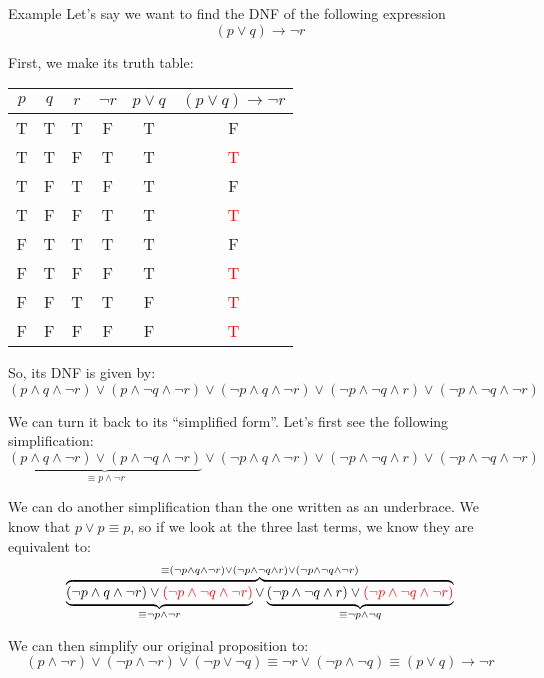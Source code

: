 \documentclass{article}
\begin{document}
\begin{parag}{Example}
    Let's say we want to find the DNF of the following expression 
    \[\left(p \lor q\right) \to \lnot r\]

    First, we make its truth table:

    \begin{center}
    \begin{tabular}{c|c|c|c|c|c}
        $p$ & $q$ & $r$ & $\lnot r$ & $p \lor q$ & $\left(p \lor q\right) \to \lnot r$ \\
        \hline
        T & T & T & F & T & F \\
        T & T & F & T & T & \textcolor{red}{T} \\
        T & F & T & F & T & F \\
        T & F & F & T & T & \textcolor{red}{T} \\
        F & T & T & T & T & F \\
        F & T & F & F & T & \textcolor{red}{T} \\
        F & F & T & T & F & \textcolor{red}{T} \\
        F & F & F & F & F & \textcolor{red}{T} \\
    \end{tabular}
    \end{center}

    So, its DNF is given by:
    \[\left(p \land q \land\lnot r\right) \lor \left(p \land \lnot q \land \lnot r\right) \lor \left(\lnot p \land q \land\lnot r\right) \lor \left(\lnot p \land \lnot q \land r\right) \lor \left(\lnot p \land \lnot q \land \lnot r\right)\]

    We can turn it back to its ``simplified form''. Let's first see the following simplification:
    \[\underbrace{\left(p \land q \land\lnot r\right) \lor \left(p \land \lnot q \land \lnot r\right)}_{\equiv p \land \lnot r} \lor \left(\lnot p \land q \land\lnot r\right) \lor \left(\lnot p \land \lnot q \land r\right) \lor \left(\lnot p \land \lnot q \land \lnot r\right)\]

    We can do another simplification than the one written as an underbrace. We know that $p \lor p \equiv p$, so if we look at the three last terms, we know they are equivalent to:
    \[\overbrace{\underbrace{\left(\lnot p \land q \land\lnot r\right) \lor \color{red}\left(\lnot p \land \lnot q \land \lnot r\right)}_{\equiv \lnot p \land \lnot r} \color{black} \lor \underbrace{\left(\lnot p \land \lnot q \land r\right) \lor \color{red}\left(\lnot p \land \lnot q \land \lnot r\right)}_{\equiv \lnot p \land \lnot q}}^{\equiv \left(\lnot p \land q \land\lnot r\right) \lor \left(\lnot p \land \lnot q \land r\right) \lor \left(\lnot p \land \lnot q \land \lnot r\right)}\]

    We can then simplify our original proposition to:
    \[\left(p \land\lnot r\right) \lor\left(\lnot p \land\lnot r\right) \lor \left(\lnot p \lor\lnot q\right) \equiv \lnot r \lor \left(\lnot p \land \lnot q\right) \equiv \left(p \lor q\right) \to \lnot r\]
\end{parag}
\end{document}
